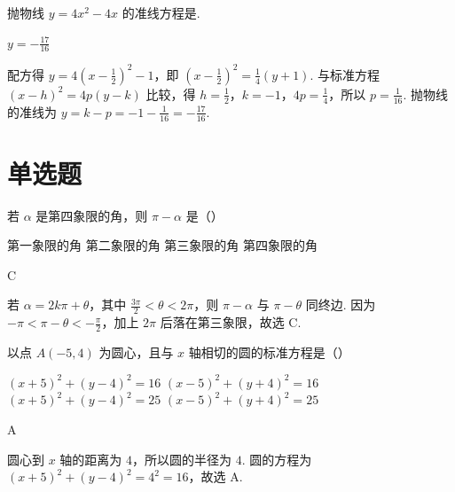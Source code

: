 \begin{problem}
抛物线 \(y=4x^2-4x\) 的准线方程是\fillinblank{}.
\end{problem}

\begin{answer}
\(y=-\frac{17}{16}\)
\end{answer}

\begin{solution}
配方得 \(y=4\left(x-\frac{1}{2}\right)^2-1\)，即 \(\left(x-\frac{1}{2}\right)^2=\frac{1}{4}(y+1)\). 与标准方程 \((x-h)^2=4p(y-k)\) 比较，得 \(h=\frac{1}{2}\)，\(k=-1\)，\(4p=\frac{1}{4}\)，所以 \(p=\frac{1}{16}\). 抛物线的准线为 \(y=k-p=-1-\frac{1}{16}=-\frac{17}{16}\).
\end{solution}

\section{单选题}

\begin{problem}
若 \(\alpha\) 是第四象限的角，则 \(\pi-\alpha\) 是（\quad）

\choices
    {第一象限的角}
    {第二象限的角}
    {第三象限的角}
    {第四象限的角}
\end{problem}

\begin{answer}
C
\end{answer}

\begin{solution}
若 \(\alpha=2k\pi+\theta\)，其中 \(\frac{3\pi}{2}<\theta<2\pi\)，则 \(\pi-\alpha\) 与 \(\pi-\theta\) 同终边. 因为 \(-\pi<\pi-\theta<-\frac{\pi}{2}\)，加上 \(2\pi\) 后落在第三象限，故选 C.
\end{solution}

\begin{problem}
以点 \(A(-5,4)\) 为圆心，且与 \(x\) 轴相切的圆的标准方程是（\quad）

\choices
    {\((x+5)^2+(y-4)^2=16\)}
    {\((x-5)^2+(y+4)^2=16\)}
    {\((x+5)^2+(y-4)^2=25\)}
    {\((x-5)^2+(y+4)^2=25\)}
\end{problem}

\begin{answer}
A
\end{answer}

\begin{solution}
圆心到 \(x\) 轴的距离为 \(4\)，所以圆的半径为 \(4\). 圆的方程为 \((x+5)^2+(y-4)^2=4^2=16\)，故选 A.
\end{solution}

